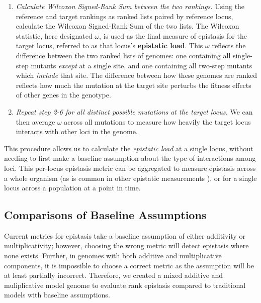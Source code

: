 \begin{enumerate}
\item \textit{Calculate Wilcoxon Signed-Rank Sum between the two rankings.} Using the reference and target rankings as ranked lists paired by reference locus, calculate the Wilcoxon Signed-Rank Sum of the two lists. The Wilcoxon statistic, here designated $\omega$, is used as the final measure of epistasis for the target locus, referred to as that locus's \textbf{epistatic load}. This $\omega$ reflects the difference between the two ranked lists of genomes: one containing all single-step mutants \textit{except} at a single site, and one containing all two-step mutants which \textit{include} that site. The difference between how these genomes are ranked reflects how much the mutation at the target site perturbs the fitness effects of other genes in the genotype.

\item \textit{Repeat step 2-6 for all distinct possible mutations at the target locus.} We can then average $\omega$ across all mutations to measure how heavily the target locus interacts with other loci in the genome.

\end{enumerate}

This procedure allows us to calculate the \textit{epistatic load} at a single locus, without needing to first make a baseline assumption about the type of interactions among loci.  
This per-locus epistasis metric can be aggregated to measure epistasis across a whole organism (as is common in other epistatic measurements \citep{elena_test_1997, franklin_mapping_2019}), or for a single locus across a population at a point in time. 

\subsection{Comparisons of Baseline Assumptions}

Current metrics for epistasis take a baseline assumption of either additivity or multiplicativity; however, choosing the wrong metric will detect epistasis where none exists. Further, in genomes with both additive and multiplicative components, it is impossible to choose a correct metric as the assumption will be at least partially incorrect. Therefore, we created a mixed additive and muliplicative model genome to evaluate rank epistasis compared to traditional models with baseline assumptions.

